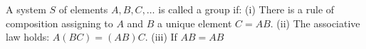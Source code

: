 A system $S$ of elements $A,B,C,\ldots$ is called a group if:
(i) There is a rule of composition assigning to $A$ and $B$ a unique element $C = AB$.
(ii) The associative law holds: $A(BC) = (AB)C$.
(iii) If $AB = AB$
